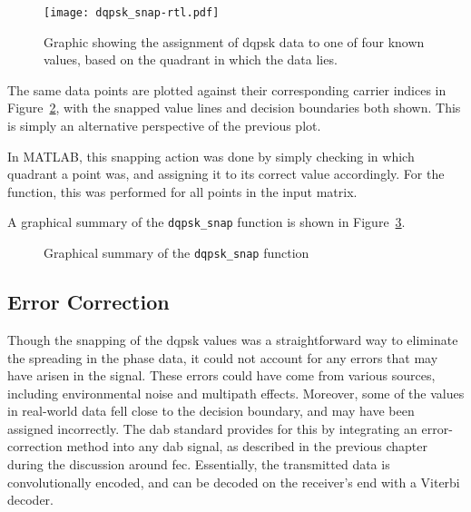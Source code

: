 \documentclass[class=report,11pt,crop=false]{standalone}
\begin{document}
\begin{figure}[htbp]
  \centering
  \captionsetup{type=figure}
  \texttt{[image: dqpsk\_snap-rtl.pdf]}
  \caption{Graphic showing the assignment of \gls{dqpsk} data to one of four known values, based on the quadrant in which the data lies.}
  \label{fig:dqpsk_snap_rtl}
\end{figure}

The same data points are plotted against their corresponding carrier indices in Figure~\ref{fig:dqpsk_snap_rtl-alt}, with the snapped value lines and decision boundaries both shown. This is simply an alternative perspective of the previous plot.

\begin{figure}[htbp]
  \centering
  \captionsetup{type=figure}
  \def\svgwidth{\linewidth}
  { %
      }
  \caption{}
  \label{fig:dqpsk_snap_rtl-alt}
\end{figure}

In MATLAB, this snapping action was done by simply checking in which quadrant a point was, and assigning it to its correct value accordingly. For the function, this was performed for all points in the input matrix.

A graphical summary of the \texttt{dqpsk\_snap} function is shown in Figure~\ref{fig:dqpsk_snap}.

\begin{figure}[htbp]
  \centering
  \captionsetup{type=figure}
  \def\svgwidth{\linewidth}
  { %
      }
      \caption{Graphical summary of the \texttt{dqpsk\_snap} function}
  \label{fig:dqpsk_snap}
\end{figure}

\subsection{Error Correction \label{subsect:dab-proc_error-correct}}
Though the snapping of the \gls{dqpsk} values was a straightforward way to eliminate the spreading in the phase data, it could not account for any errors that may have arisen in the signal. These errors could have come from various sources, including environmental noise and multipath effects. Moreover, some of the values in real-world data fell close to the decision boundary, and may have been assigned incorrectly. The \gls{dab} standard provides for this by integrating an error-correction method into any \gls{dab} signal, as described in the previous chapter during the discussion around \gls{fec}. Essentially, the transmitted data is convolutionally encoded, and can be decoded on the receiver's end with a Viterbi decoder.
\end{document}
